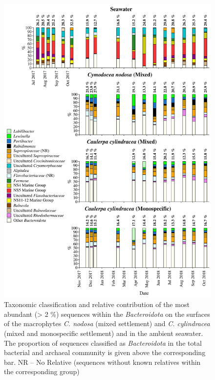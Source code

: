 \documentclass[12pt,]{article}
\begin{document}
\begin{figure}[H]

{\centering \includegraphics[width=0.85\linewidth]{../results/figures/bacteroidota_bar_plot} 

}

\caption{Taxonomic classification and relative contribution of the most abundant (> 2 \si{\percent}) sequences within the \textit{Bacteroidota} on the surfaces of the macrophytes \textit{C. nodosa} (mixed settlement) and \textit{C. cylindracea} (mixed and monospecific settlement) and in the ambient seawater. The proportion of sequences classified as \textit{Bacteroidota} in the total bacterial and archaeal community is given above the corresponding bar. NR -- No Relative (sequences without known relatives within the corresponding group)\label{bactero}}\label{fig:unnamed-chunk-6}
\end{figure}
\end{document}
